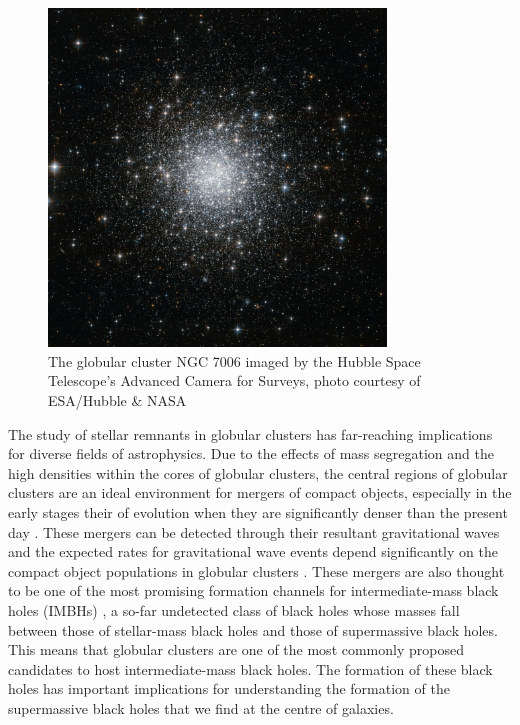 \begin{figure}
	\centering
	\includegraphics[width=0.8\textwidth]{figures/c42.jpg}
	\caption{The globular cluster NGC 7006 imaged by the Hubble Space Telescope's Advanced
		Camera for Surveys, photo courtesy of ESA/Hubble \& NASA}
	\label{fig:1/ngc7006}
\end{figure}



The study of stellar remnants in globular clusters has far-reaching implications for diverse fields
of astrophysics.  Due to the effects of mass segregation and the high densities within the cores of
globular clusters, the central regions of globular clusters are an ideal environment for mergers of
compact objects, especially in the early stages their of evolution when they are significantly
denser than the present day \citep[e.g.][]{PortegiesZwart2004,Rodriguez2021}. These mergers can be
detected through their resultant gravitational waves and the expected rates for gravitational wave
events depend significantly on the compact object populations in globular clusters
\citep[e.g][]{Weatherford2021}. These mergers are also thought to be one of the most promising
formation channels for intermediate-mass black holes (IMBHs) \citep[e.g.][]{Giersz2015}, a so-far
undetected class of black holes whose masses fall between those of stellar-mass black holes and
those of supermassive black holes. This means that globular clusters are one of the most commonly
proposed candidates to host intermediate-mass black holes. The formation of these black holes has
important implications for understanding the formation of the supermassive black holes that we find
at the centre of galaxies.


